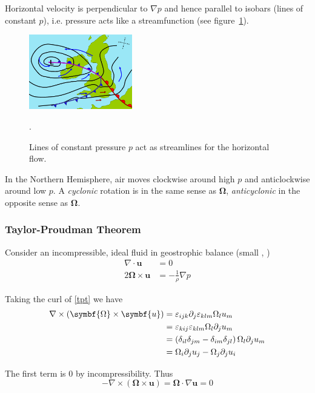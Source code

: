 \documentclass{jknotes}
\begin{document}
Horizontal velocity is perpendicular to $\nabla p$ and hence parallel to
isobars (lines of constant $p$), i.e. pressure acts like a streamfunction (see
figure~\ref{fig:isobars}).

\begin{figure}
	\centering
	\includegraphics[width=0.4\textwidth]{isobars.png}
	\caption{Lines of constant pressure $p$ act as streamlines for the
	horizontal flow.}
	\label{fig:isobars}.
\end{figure}

In the Northern Hemisphere, air moves clockwise around high $p$ and
anticlockwise around low $p$. A \emph{cyclonic} rotation is in the same sense
as $\symbf{\Omega}$, \emph{anticyclonic} in the opposite sense as $\symbf{\Omega}$.

\subsubsection{Taylor-Proudman Theorem}
Consider an incompressible, ideal fluid in geostrophic balance (small \Ro,
\Ek)
\begin{align}
	\nabla \cdot \symbf{u} &= 0\\
	2 \symbf{\Omega} \times \symbf{u} &= -\frac{1}{\rho}\nabla p \label{tpt}
\end{align}

Taking the curl of \eqref{tpt} we have
\begin{equation}
	\begin{aligned}
		\nabla \times \left( \symbf{\Omega} \times \symbf{u}\right) &= \vare_{ijk}
		\partial_j \vare_{klm} \Omega_l u_m \\
		&= \vare_{kij} \vare_{klm} \Omega_l \partial_j u_m \\
		&= \left(\delta_{il} \delta_{jm} - \delta_{im} \delta_{jl}\right)
		\Omega_l \partial_j u_m \\
		&= \Omega_i \partial_j u_j - \Omega_j \partial_j u_i
	\end{aligned}
\end{equation}

The first term is $0$ by incompressibility. Thus
\begin{equation}
	-\nabla \times \left(\symbf{\Omega} \times \symbf{u}\right) = \symbf{\Omega} \cdot
	\nabla \symbf{u} = 0
\end{equation}
\end{document}
